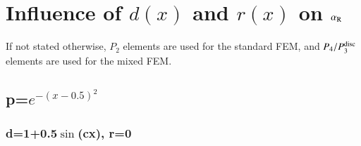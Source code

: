 \documentclass[review,3p]{elsarticle}
\begin{document}
\section{Influence of $d(x)$ and $r(x)$ on \texorpdfstring{$\alpha_{\rm R}$}{alpha_{rm R}}}         \label{discretization_error_bench_pois_diff_Helm}

If not stated otherwise, $P_2$ elements are used for the standard FEM, and $P_4/P_3^{\rm disc}$ elements are used for the mixed FEM.

%
%
%

\subsection{\texorpdfstring{p=$e^{-(x-0.5)^2}$}{p=e^{-(x-0.5)^2}}}			\label{p_exp_2_diff_2_Helm}

\subsubsection{d=1+0.5\texorpdfstring{$\sin$(cx)}{sin(cx)}, r=0}            \label{p_exp_d_1plus0p5sin_r_0}
\end{document}
